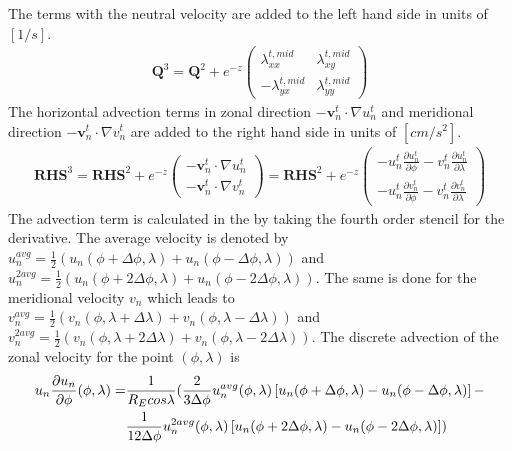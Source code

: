 %
The terms with the neutral velocity are added to the left hand side
in units of $[1/s]$.
%
\begin{gather}
  \mathbf{Q}^3= \mathbf{Q}^2 + e^{-z}
   \begin{pmatrix}
       \lambda_{xx}^{t, mid} &  \lambda_{xy}^{t, mid}\\
      -\lambda_{yx}^{t, mid} & \lambda_{yy}^{t, mid}
   \end{pmatrix}
\end{gather}
%
The horizontal advection terms in zonal direction $-
\mathbf{v}_n^t\cdot \nabla u_n^t$ and meridional direction $-
\mathbf{v}_n^t\cdot \nabla v_n^t$ are added to the right hand side
in units of $[cm/s^2]$.
%
\begin{gather}
  \mathbf{RHS}^3= \mathbf{RHS}^2 + e^{-z}
   \begin{pmatrix}
     -\mathbf{v}_n^t\cdot \nabla u_n^t  \\
     -\mathbf{v}_n^t\cdot \nabla v_n^t
   \end{pmatrix} = \mathbf{RHS}^2 + e^{-z}
   \begin{pmatrix}
     - u_n^t \frac{\partial u_n^t}{\partial \phi} - v_n^t \frac{\partial u_n^t}{\partial \lambda } \\
     - u_n^t \frac{\partial v_n^t}{\partial \phi} - v_n^t \frac{\partial v_n^t}{\partial \lambda }
   \end{pmatrix}
\end{gather} \label{eq:duv_horiz_advec}
%
The advection term is calculated in the  by
taking the fourth order stencil for the derivative. The average
velocity is denoted by $u_n^{avg} = \frac{1}{2} (u_n(\phi+\Delta
\phi,\lambda) + u_n (\phi-\Delta \phi,\lambda))$ and $u_n^{2 avg} =
\frac{1}{2} (u_n(\phi+2\Delta \phi,\lambda) + u_n (\phi-2\Delta
\phi,\lambda))$. The same is done for the meridional velocity $v_n$
which leads to $v_n^{avg} = \frac{1}{2} (v_n(\phi,\lambda+\Delta
\lambda) + v_n (\phi,\lambda-\Delta \lambda))$ and $v_n^{2 avg} =
\frac{1}{2} (v_n(\phi,\lambda+2\Delta \lambda) + v_n
(\phi,\lambda-2\Delta \lambda))$. The discrete advection of the
zonal velocity for the point $(\phi,\lambda)$ is
%
\begin{align}
  u_n \frac{\partial u_n}{\partial \phi}(\phi,\lambda) = &
  \frac{1}{R_E cos \lambda} ( \frac{2}{3 \Delta \phi}
  u_n^{avg}(\phi,\lambda) \left[
   u_n(\phi+\Delta
   \phi,\lambda) - u_n(\phi-\Delta
   \phi,\lambda)  \right] - \notag \\
   {} & \frac{1}
   {12 \Delta \phi}u_n^{2avg}(\phi,\lambda) \left[
   u_n(\phi+2\Delta
   \phi,\lambda) - u_n(\phi-2\Delta \phi,\lambda)  \right] )
\end{align}
